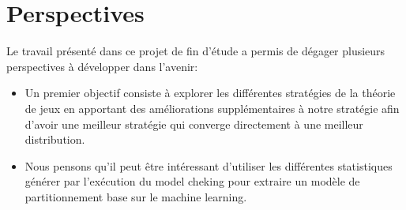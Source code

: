 \section*{Perspectives}
Le travail présenté dans ce projet de fin d'étude a permis de dégager plusieurs perspectives à développer dans l’avenir:
\begin{itemize}
	\item Un premier objectif consiste à explorer les différentes stratégies de la théorie de jeux en apportant des améliorations supplémentaires à notre stratégie afin d’avoir une meilleur stratégie qui converge directement à une meilleur distribution.
	\item Nous pensons qu’il peut être intéressant d'utiliser les différentes statistiques générer par l'exécution du model cheking pour  extraire un modèle de partitionnement base sur le machine learning.
\end{itemize}
